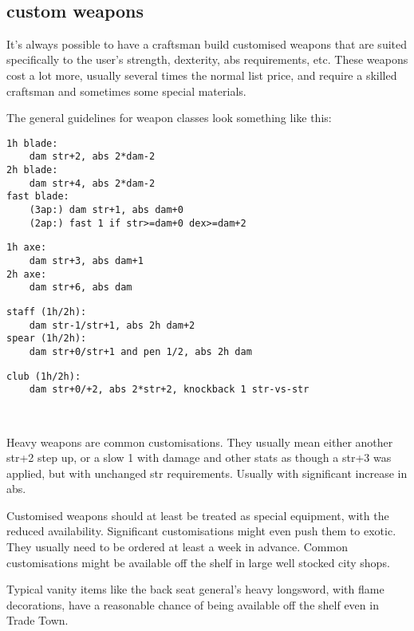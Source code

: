 \


\subsection*{custom weapons}
It's always possible to have a craftsman build customised weapons that are suited specifically to the user's strength, dexterity, abs requirements, etc. These weapons cost a lot more, usually several times the normal list price, and require a skilled craftsman and sometimes some special materials.

The general guidelines for weapon classes look something like this:\\
\small \begin{samepage} \begin{verbatim}
1h blade:
    dam str+2, abs 2*dam-2
2h blade:
    dam str+4, abs 2*dam-2
fast blade:
    (3ap:) dam str+1, abs dam+0
    (2ap:) fast 1 if str>=dam+0 dex>=dam+2
\end{verbatim} \blocklistgap \begin{verbatim}
1h axe:
    dam str+3, abs dam+1
2h axe:
    dam str+6, abs dam
\end{verbatim} \blocklistgap \begin{verbatim}
staff (1h/2h):
    dam str-1/str+1, abs 2h dam+2
spear (1h/2h):
    dam str+0/str+1 and pen 1/2, abs 2h dam
\end{verbatim} \blocklistgap \begin{verbatim}
club (1h/2h):
    dam str+0/+2, abs 2*str+2, knockback 1 str-vs-str
\end{verbatim} \end{samepage} \normalsize \goodbreak

\

Heavy weapons are common customisations. They usually mean either another str+2 step up, or a slow 1 with damage and other stats as though a str+3 was applied, but with unchanged str requirements. Usually with significant increase in abs.

Customised weapons should at least be treated as special equipment, with the reduced availability. Significant customisations might even push them to exotic. They usually need to be ordered at least a week in advance. Common customisations might be available off the shelf in large well stocked city shops.

Typical vanity items like the back seat general's heavy longsword, with flame decorations, have a reasonable chance of being available off the shelf even in Trade Town.

